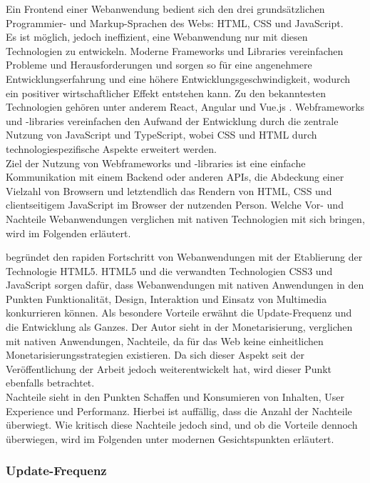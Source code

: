 \documentclass[a4paper]{scrartcl}
\begin{document}
Ein Frontend einer Webanwendung bedient sich den drei grundsätzlichen Programmier- und Markup-Sprachen des Webs: HTML, CSS und JavaScript. \\
Es ist möglich, jedoch ineffizient, eine Webanwendung nur mit diesen Technologien zu entwickeln. Moderne Frameworks und Libraries vereinfachen Probleme und Herausforderungen und sorgen so für eine angenehmere Entwicklungserfahrung und eine höhere Entwicklungsgeschwindigkeit, wodurch ein positiver wirtschaftlicher Effekt entstehen kann. Zu den bekanntesten Technologien gehören unter anderem React, Angular und Vue.js \autocite{Clement}. Webframeworks und -libraries vereinfachen den Aufwand der Entwicklung durch die zentrale Nutzung von JavaScript und TypeScript, wobei CSS und HTML durch technologiespezifische Aspekte erweitert werden. \\
Ziel der Nutzung von Webframeworks und -libraries ist eine einfache Kommunikation mit einem Backend oder anderen APIs, die Abdeckung einer Vielzahl von Browsern und letztendlich das Rendern von HTML, CSS und clientseitigem JavaScript im Browser der nutzenden Person. Welche Vor- und Nachteile Webanwendungen verglichen mit nativen Technologien mit sich bringen, wird im Folgenden erläutert.

\textcite[27]{Jobe} begründet den rapiden Fortschritt von Webanwendungen mit der Etablierung der Technologie HTML5. HTML5 und die verwandten Technologien CSS3 und JavaScript sorgen dafür, dass Webanwendungen mit nativen Anwendungen in den Punkten Funktionalität, Design, Interaktion und Einsatz von Multimedia konkurrieren können. Als besondere Vorteile erwähnt \textcite[28]{Jobe} die Update-Frequenz und die Entwicklung als Ganzes. Der Autor sieht in der Monetarisierung, verglichen mit nativen Anwendungen, Nachteile, da für das Web keine einheitlichen Monetarisierungsstrategien existieren. Da sich dieser Aspekt seit der Veröffentlichung der Arbeit jedoch weiterentwickelt hat, wird dieser Punkt ebenfalls betrachtet. \\
Nachteile sieht \textcite[28]{Jobe} in den Punkten Schaffen und Konsumieren von Inhalten, User Experience und Performanz. Hierbei ist auffällig, dass die Anzahl der Nachteile überwiegt. Wie kritisch diese Nachteile jedoch sind, und ob die Vorteile dennoch überwiegen, wird im Folgenden unter modernen Gesichtspunkten erläutert. \\

\subsubsection{Update-Frequenz}
\end{document}
